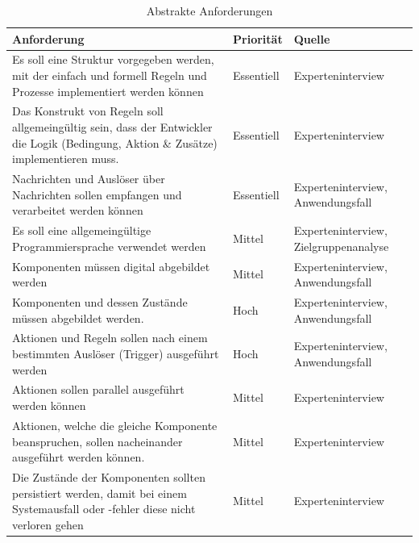     \begin{table}[hbt!]
        \begin{center}
            \begin{tabular}{| p{10.4cm} | p{2.0cm} | p{3.0cm} | }
                \hline
                   \textbf{Anforderung} & \textbf{Priorität} & \textbf{Quelle} \\
                \hline
                    Es soll eine Struktur vorgegeben werden, mit der einfach und formell Regeln und Prozesse implementiert werden können & Essentiell & Experteninterview \\ 
                \hline
                    Das Konstrukt von Regeln soll allgemeingültig sein, dass der Entwickler die Logik (Bedingung, Aktion \& Zusätze) implementieren muss. & Essentiell & Experteninterview \\
                \hline
                    Nachrichten und Auslöser über Nachrichten sollen empfangen und verarbeitet werden können & Essentiell & Experteninterview, Anwendungsfall \\
                \hline
                    Es soll eine allgemeingültige Programmiersprache verwendet werden & Mittel & Experteninterview, Zielgruppenanalyse \\ 
                \hline
                    Komponenten müssen digital abgebildet werden & Mittel & Experteninterview, Anwendungsfall \\ 
                \hline
                    Komponenten und dessen Zustände müssen abgebildet werden. & Hoch & Experteninterview, Anwendungsfall \\ 
                \hline
                    Aktionen und Regeln sollen nach einem bestimmten Auslöser (Trigger) ausgeführt werden & Hoch & Experteninterview, Anwendungsfall \\
                \hline
                    Aktionen sollen parallel ausgeführt werden können & Mittel & Experteninterview \\ 
                \hline
                    Aktionen, welche die gleiche Komponente beanspruchen, sollen nacheinander ausgeführt werden können. & Mittel & Experteninterview \\
                \hline
                    Die Zustände der Komponenten sollten persistiert werden, damit bei einem Systemausfall oder -fehler diese nicht verloren gehen  & Mittel & Experteninterview \\ 
                \hline 
            \end{tabular}
        \end{center}
        \caption{Abstrakte Anforderungen}
        \label{tab:abstractRequirements}
    \end{table} 
